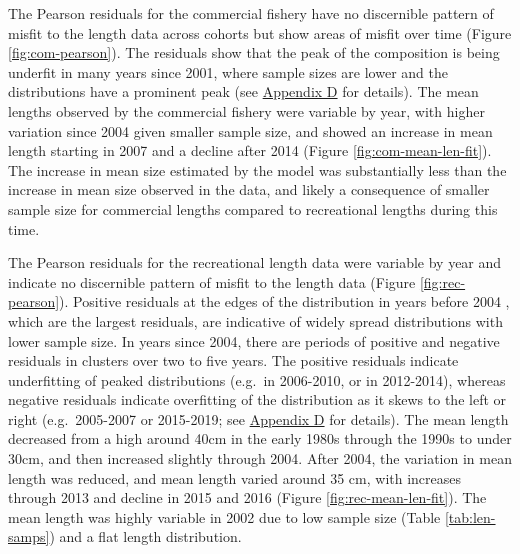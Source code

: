 \documentclass[11pt,
  english,
  a4paper,
]{article}
\begin{document}
The Pearson residuals for the commercial fishery have no discernible pattern of misfit to the length data across cohorts but show areas of misfit over time (Figure \ref{fig:com-pearson}). The residuals show that the peak of the composition is being underfit in many years since 2001, where sample sizes are lower and the distributions have a prominent peak (see {\protect\hyperlink{append_d}{Appendix D}\leavevmode\tagmcend\tagstructend} for details). The mean lengths observed by the commercial fishery were variable by year, with higher variation since 2004 given smaller sample size, and showed an increase in mean length starting in 2007 and a decline after 2014 (Figure \ref{fig:com-mean-len-fit}). The increase in mean size estimated by the model was substantially less than the increase in mean size observed in the data, and likely a consequence of smaller sample size for commercial lengths compared to recreational lengths during this time.

\leavevmode\tagmcend\tagstructend\par


The Pearson residuals for the recreational length data were variable by year and indicate no discernible pattern of misfit to the length data (Figure \ref{fig:rec-pearson}). Positive residuals at the edges of the distribution in years before 2004 , which are the largest residuals, are indicative of widely spread distributions with lower sample size. In years since 2004, there are periods of positive and negative residuals in clusters over two to five years. The positive residuals indicate underfitting of peaked distributions (e.g.~in 2006-2010, or in 2012-2014), whereas negative residuals indicate overfitting of the distribution as it skews to the left or right (e.g.~2005-2007 or 2015-2019; see {\protect\hyperlink{append_d}{Appendix D}\leavevmode\tagmcend\tagstructend} for details). The mean length decreased from a high around 40cm in the early 1980s through the 1990s to under 30cm, and then increased slightly through 2004. After 2004, the variation in mean length was reduced, and mean length varied around 35 cm, with increases through 2013 and decline in 2015 and 2016 (Figure \ref{fig:rec-mean-len-fit}). The mean length was highly variable in 2002 due to low sample size (Table \ref{tab:len-samps}) and a flat length distribution.

\leavevmode\tagmcend\tagstructend\par
\end{document}

